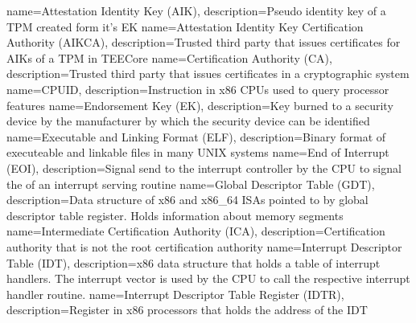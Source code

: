 
%
{
  name=Attestation Identity Key (AIK),
  description={Pseudo identity key of a TPM created form it's EK}
}
{
  name=Attestation Identity Key Certification Authority (AIKCA),
  description={Trusted third party that issues certificates for AIKs of a TPM in TEECore}
}
%
{
  name=Certification Authority (CA),
  description={Trusted third party that issues certificates in a cryptographic system}
}
{
  name=CPUID,
  description={Instruction in x86 CPUs used to query processor features}
}
%
{
  name=Endorsement Key (EK),
  description={Key burned to a security device by the manufacturer by which the security device can be identified}
}
{
  name=Executable and Linking Format (ELF),
  description={Binary format of executeable and linkable files in many UNIX systems}
}
{
  name=End of Interrupt (EOI),
  description={Signal send to the interrupt controller by the CPU to signal the of an interrupt serving routine}
}
%
{
  name=Global Descriptor Table (GDT),
  description={Data structure of x86 and x86\_64 ISAs pointed to by global descriptor table register.
  Holds information about memory segments}
}
%
{
  name=Intermediate Certification Authority (ICA),
  description={Certification authority that is not the root certification authority}
}
{
  name=Interrupt Descriptor Table (IDT),
  description={x86 data structure that holds a table of interrupt handlers. The interrupt vector is used by the CPU to
  call the respective interrupt handler routine.}
}
{
  name=Interrupt Descriptor Table Register (IDTR),
  description={Register in x86 processors that holds the address of the IDT}
}
